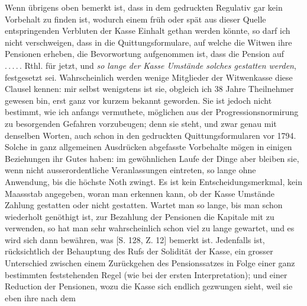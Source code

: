 Wenn übrigens oben bemerkt ist, dass in dem gedruckten Regulativ gar kein Vorbehalt zu finden ist, wodurch einem früh oder spät aus dieser Quelle entspringenden Verbluten der Kasse Einhalt gethan werden könnte, so darf ich nicht verschweigen, dass in die Quittungsformulare, auf welche die Witwen ihre Pensionen erheben, die Bevorwortung aufgenommen ist, dass die Pension auf .\,.\,.\,.\,. Rthl. für jetzt, und \textit{so lange der Kasse Umstände solches gestatten werden}, festgesetzt sei. Wahrscheinlich werden wenige Mitglieder der Witwenkasse diese Clausel kennen: mir selbst wenigstens ist sie, obgleich ich 38 Jahre Theilnehmer gewesen bin, erst ganz vor kurzem bekannt geworden. Sie ist jedoch nicht bestimmt, wie ich anfangs vermuthete, möglichen aus der Progressionsnormirung zu besorgenden Gefahren vorzubeugen; denn sie steht, und zwar genau mit denselben Worten, auch schon in den gedruckten Quittungsformularen vor 1794. Solche in ganz allgemeinen Ausdrücken abgefasste Vorbehalte mögen in einigen Beziehungen ihr Gutes haben: im gewöhnlichen Laufe der Dinge aber bleiben sie, wenn nicht ausserordentliche Veranlassungen eintreten, so lange ohne Anwendung, bis die höchste Noth zwingt. Es ist kein Entscheidungsmerkmal, kein Maassstab angegeben, woran man erkennen kann, ob der Kasse Umstände Zahlung gestatten oder nicht gestatten. Wartet man so lange, bis man schon wiederholt genöthigt ist, zur Bezahlung der Pensionen die Kapitale mit zu verwenden, so hat man sehr wahrscheinlich schon viel zu lange gewartet, und es wird sich dann bewähren, was [S. 128, Z. 12] bemerkt ist. Jedenfalls ist, rücksichtlich der Behauptung des Rufs der Solidität der Kasse, ein grosser Unterschied zwischen einem Zurückgehen des Pensionssatzes in Folge einer ganz bestimmten feststehenden Regel (wie bei der ersten Interpretation); und einer Reduction der Pensionen, wozu die Kasse sich endlich gezwungen sieht, weil sie eben ihre nach dem
